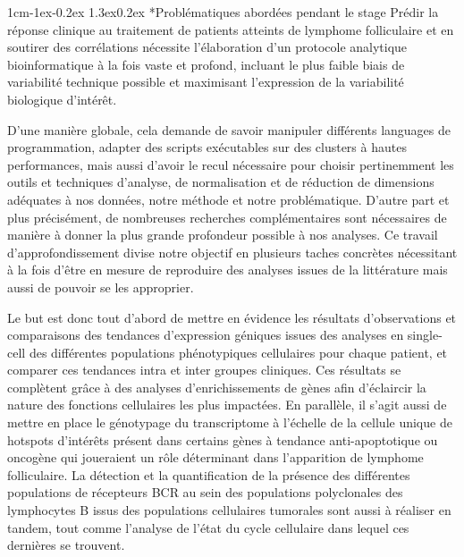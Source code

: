 \documentclass[12pt]{report}
\makeatletter
\renewcommand\subsubsection{\@startsection{subsubsection}{3}{\z@}%
	{1cm\@plus -1ex\@minus -0.2ex}%
	{1.3ex\@plus 0.2ex}%
	{\reset@font\normalsize\bf}}
\makeatother
\begin{document}
\subsubsection*{Problématiques abordées pendant le stage}
Prédir la réponse clinique au traitement de patients atteints de lymphome folliculaire et en soutirer des corrélations nécessite l'élaboration d'un protocole analytique bioinformatique à la fois vaste et profond,
incluant le plus faible biais de variabilité technique possible et maximisant l'expression de la variabilité biologique d'intérêt. 

D'une manière globale, cela demande de savoir manipuler différents languages de programmation, adapter des scripts exécutables sur des clusters à hautes performances,
mais aussi d'avoir le recul nécessaire pour choisir pertinemment les outils et techniques d'analyse, de normalisation et de réduction de dimensions adéquates à nos données, notre méthode et notre problématique.
D'autre part et plus précisément, de nombreuses recherches complémentaires sont nécessaires de manière à donner la plus grande profondeur possible à nos analyses. 
Ce travail d'approfondissement divise notre objectif en plusieurs taches concrètes nécessitant à la fois d'être en mesure de reproduire des analyses issues de la littérature mais aussi de pouvoir se les approprier. 

Le but est donc tout d'abord de mettre en évidence les résultats d'observations et comparaisons des tendances d'expression géniques issues des analyses en single-cell des différentes populations phénotypiques cellulaires pour chaque patient, et comparer ces tendances intra et inter groupes cliniques.
Ces résultats se complètent grâce à des analyses d'enrichissements de gènes afin d'éclaircir la nature des fonctions cellulaires les plus impactées.
En parallèle, il s'agit aussi de mettre en place le génotypage du transcriptome à l'échelle de la cellule unique de hotspots d'intérêts présent dans certains gènes à tendance anti-apoptotique ou oncogène qui joueraient un rôle déterminant dans l'apparition de lymphome folliculaire.
La détection et la quantification de la présence des différentes populations de récepteurs BCR au sein des populations polyclonales des lymphocytes B issus des populations cellulaires tumorales sont aussi à réaliser en tandem, 
tout comme l'analyse de l'état du cycle cellulaire dans lequel ces dernières se trouvent.
\end{document}
